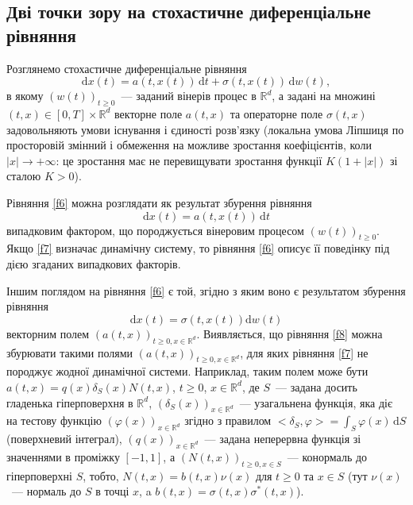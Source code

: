 \documentclass[11pt, reqno]{amsart}
\begin{document}
\subsection{Дві точки зору на стохастичне диференціальне рівняння}
Розглянемо стохастичне диференціальне рівняння
\begin{equation}
\label{f6}
\mathrm{d}x(t)=a(t, x(t))\,\mathrm{d}t + \sigma(t, x(t))\,\mathrm{d}w(t),
\end{equation}
в якому $(w(t))_{t\geq0}$~--- заданий вінерів процес в $\mathbb{R}^d$, а задані на множині
$(t, x)\in[0, T]\times \mathbb{R}^d$ векторне поле $a(t, x)$ та операторне поле $\sigma(t, x)$ задовольняють умови існування і єдиності розв'язку (локальна умова Ліпшиця по просторовій змінний і обмеження на можливе зростання коефіцієнтів, коли $|x|\to+\infty$: це зростання має не перевищувати зростання функції $K(1+|x|)$ зі сталою $K>0$).

Рівняння \eqref{f6} можна розглядати як результат збурення рівняння
\begin{equation}
\label{f7}
\mathrm{d}x(t)=a(t, x(t))\,\mathrm{d}t
\end{equation}
випадковим фактором, що породжується вінеровим процесом $(w(t))_{t\geq0}$. Якщо \eqref{f7}  визначає динамічну систему, то рівняння \eqref{f6} описує її поведінку під дією згаданих випадкових факторів.

Іншим поглядом на рівняння \eqref{f6} є той, згідно з яким воно є результатом збурення рівняння
\begin{equation}
\label{f8}
\mathrm{d}x(t)=\sigma(t, x(t))\mathrm{d}w(t)
\end{equation}
векторним полем $(a(t, x))_{t\geq0, x\in \mathbb{R}^d}$. Виявляється, що рівняння \eqref{f8} можна збурювати такими полями $(a(t, x))_{t\geq0, x\in \mathbb{R}^d}$, для яких рівняння \eqref{f7} не породжує жодної динамічної системи. Наприклад, таким полем може бути $a(t, x)=q(x)\delta_{S}(x)N(t, x)$, $t\geq0$, $x\in \mathbb{R}^d$, де $S$~--- задана досить гладенька гіперповерхня в $\mathbb{R}^d$, $(\delta_{S}(x))_{x\in \mathbb{R}^d}$~--- узагальнена функція, яка діє на тестову функцію $(\varphi(x))_{x\in \mathbb{R}^d}$ згідно з правилом $<\delta_S, \varphi>= \int_S\varphi(x)\,\mathrm{d}S$ (поверхневий інтеграл), $(q(x))_{x\in \mathbb{R}^d}$~--- задана неперервна функція зі значеннями в проміжку $[-1, 1]$, а $(N(t, x))_{t\geq0, x\in S}$~--- конормаль до гіперповерхні $S$, тобто, $N(t,x)=b(t,x)\nu(x)$ для $t\geq0$ та $x\in S$ (тут  $\nu(x)$~--- нормаль до $S$ в точці $x$, a $b(t,x)=\sigma(t, x)\sigma^*(t, x)$).
\end{document}
